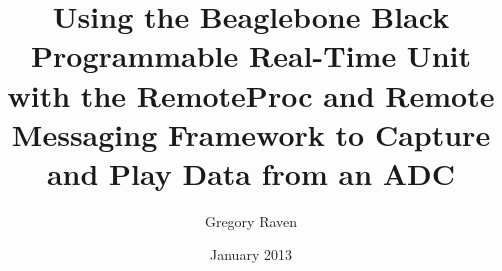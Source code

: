 \documentclass[a4paper,12pt]{book}
\begin{document}
\author{Gregory Raven}
\title{Using the Beaglebone Black Programmable Real-Time Unit with the RemoteProc and Remote Messaging Framework to Capture and Play Data from an ADC}
\date{January 2013}

\frontmatter

\maketitle
\tableofcontents

\mainmatter










\backmatter
\end{document}
